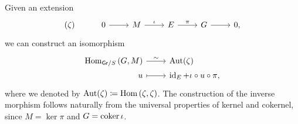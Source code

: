\begin{rem}[]\label{rem:CorrExtAutMor}
	Given an extension
	\begin{equation*}
	\begin{tikzcd}
		(\zeta) &
		0 \arrow[r, "", rightarrow] &
		M \arrow[r, "\iota", rightarrow] &
		E \arrow[r, "\pi", rightarrow] &
		G \arrow[r, "", rightarrow] &
		0
	,\end{tikzcd}
	\end{equation*}
	we can construct an isomorphism
	\begin{equation*}
	\begin{tikzcd}[row sep = 0ex
		,/tikz/column 1/.append style={anchor=base east}
		,/tikz/column 2/.append style={anchor=base west}]
		\Hom_{\mathsf{Gr}/S} \left( G, M \right)
		\arrow[r, "\sim", rightarrow] &
		\mathrm{Aut}(\zeta) \\
		u \arrow[r, "", mapsto] & 
		\id_{ E } + \iota \circ u \circ \pi
	,\end{tikzcd}
	\end{equation*} 
	where we denoted by $\mathrm{Aut}(\zeta) \coloneqq \operatorname{Hom} \left( \zeta, \zeta \right)$.
	The construction of the inverse morphism follows naturally from the 
	universal properties of kernel and cokernel, since $M = \ker \pi$
	and $G = \operatorname{coker} \iota$.
\end{rem}


